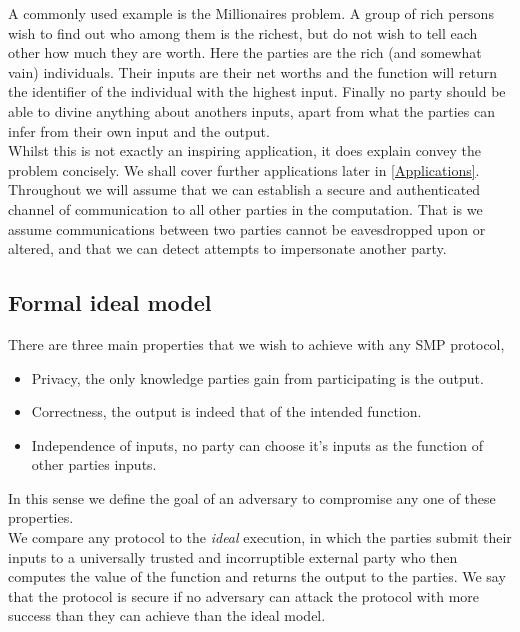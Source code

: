 \documentclass[a4paper,10pt]{article}
\begin{document}
			A commonly used example is the Millionaires problem. A group of rich persons wish to find out who among them is the richest, but do not wish to tell each other how much they are worth. Here the parties are the rich (and somewhat vain) individuals. Their inputs are their net worths and the function will return the identifier of the individual with the highest input. Finally no party should be able to divine anything about anothers inputs, apart from what the parties can infer from their own input and the output.\\
      
			Whilst this is not exactly an inspiring application, it does explain convey the problem concisely. We shall cover further applications later in \ref{Applications}.\\

			Throughout we will assume that we can establish a secure and authenticated channel of communication to all other parties in the computation. That is we assume communications between two parties cannot be eavesdropped upon or altered, and that we can detect attempts to impersonate another party.


		\subsection{Formal ideal model}
			There are three main properties that we wish to achieve with any SMP protocol,
			\begin{itemize}
				\item Privacy, the only knowledge parties gain from participating is the output.
				\item Correctness, the output is indeed that of the intended function.
				\item Independence of inputs, no party can choose it's inputs as the function of other parties inputs.
			\end{itemize}

			In this sense we define the goal of an adversary to compromise any one of these properties.\\

			We compare any protocol to the \emph{ideal} execution, in which the parties submit their inputs to a universally trusted and incorruptible external party who then computes the value of the function and returns the output to the parties. We say that the protocol is secure if no adversary can attack the protocol with more success than they can achieve than the ideal model.\\
\end{document}
